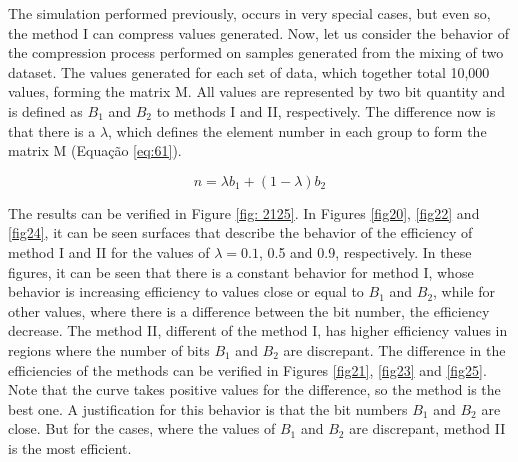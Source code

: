 \documentclass[10pt]{article}
\begin{document}
The simulation performed previously, occurs in very special cases, but even so, the method I can compress values ​​generated. Now, let us consider the behavior of the compression process performed on samples generated from the mixing of two dataset. The values ​​generated for each set of data, which together total 10,000 values, forming the matrix M. All values ​​are represented by two bit quantity and is defined as $B_1$ and $B_2$ to methods I and II, respectively. The difference now is that there is a $\lambda$, which defines the element number in each group to form the matrix M (Equação \ref{eq:61}).

\begin{equation}\label{eq:61}
  n = \lambda b_1 + (1-\lambda) b_2
\end{equation}


The results can be verified in Figure \ref{fig: 2125}. In Figures \ref{fig20}, \ref{fig22} and \ref{fig24}, it can be seen surfaces that describe the behavior of the efficiency of method I and II for the values ​​of $\lambda = 0.1$, 0.5 and 0.9, respectively. In these figures, it can be seen that there is a constant behavior for method I, whose behavior is increasing efficiency to values ​​close or equal to $B_1$ and $B_2$, while for other values​​, where there is a difference between the bit number, the efficiency decrease. The method II, different of the method I, has higher efficiency values ​​in regions where the number of bits $B_1$ and $B_2 $ are discrepant. The difference in the efficiencies of the methods can be verified in Figures \ref{fig21}, \ref{fig23} and \ref{fig25}. Note that the curve takes positive values ​​for the difference, so the method is the best one. A justification for this behavior is that the bit numbers $B_1 $ and $ B_2 $ are close. But for the cases, where the values ​​of $B_1$ and $B_2 $ are discrepant, method II is the most efficient.
\end{document}
